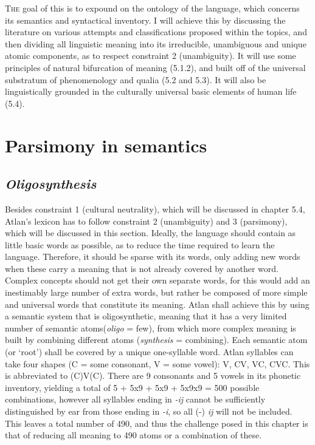 
\lettrine{T}{he} goal of this is to expound on the ontology of the language, which concerns its semantics and syntactical inventory. I will achieve this by discussing the literature on various attempts and classifications proposed within the topics, and then dividing all linguistic meaning into its irreducible, unambiguous and unique atomic components, as to respect constraint 2 (unambiguity). It will use some principles of natural bifurcation of meaning (5.1.2), and built off of the universal substratum of phenomenology and qualia (5.2 and 5.3). It will also be linguistically grounded in the culturally universal basic elements of human life (5.4).


\section{Parsimony in semantics}

\subsection{\it Oligosynthesis}


Besides constraint 1 (cultural neutrality), which will be discussed in chapter 5.4, Atlan’s lexicon has to follow constraint 2 (unambiguity) and 3 (parsimony), which will be discussed in this section. Ideally, the language should contain as little basic words as possible, as to reduce the time required to learn the language. Therefore, it should be sparse with its words, only adding new words when these carry a meaning that is not already covered by another word. Complex concepts should not get their own separate words, for this would add an inestimably large number of extra words, but rather be composed of more simple and universal words that constitute its meaning. Atlan shall achieve this by using a semantic system that is oligosynthetic, meaning that it has a very limited number of semantic atoms\footnotemark (\textit{oligo}  = few), from which more complex meaning is built by combining different atoms (\textit{synthesis}  = combining). Each semantic atom (or ‘root’) shall be covered by a unique one-syllable word. Atlan syllables can take four shapes (C = some consonant, V = some vowel): V, CV, VC, CVC. This is abbreviated to (C)V(C). There are 9 consonants and 5 vowels in its phonetic inventory, yielding a total of 5 + 5x9 + 5x9 + 5x9x9 = 500 possible combinations, however all syllables ending in \textit{-ij} cannot be sufficiently distinguished by ear from those ending in \textit{-i}, so all (-) \textit{ij} will not be included. This leaves a total number of 490, and thus the challenge posed in this chapter is that of reducing all meaning to 490 atoms or a combination of these.  

